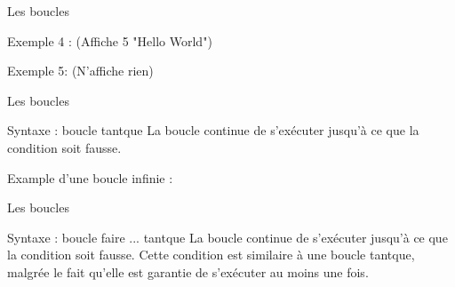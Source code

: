 	\begin{frame}{Les boucles}
		\begin{minipage}[t]{0.8\linewidth}
			Exemple 4 :  (\alert{Affiche 5 "Hello World"})
			\forExmpFour
		\end{minipage}
		\begin{minipage}[t]{0.8\linewidth}
			Exemple 5: (\alert{N'affiche rien})
			\forExmpFive
		\end{minipage}
	\end{frame}



	\begin{frame}{Les boucles}
		\begin{block}{Syntaxe : boucle tantque}
			\WhileSyntax
			La boucle continue de s'exécuter jusqu'à ce que la condition soit \alert{fausse}.
		\end{block}
		\begin{exampleblock}{Example d'une boucle infinie :}
			\WhileInfinite
		\end{exampleblock}
	\end{frame}

	\begin{frame}{Les boucles}
		\begin{block}{Syntaxe : boucle faire ... tantque}
			\doWhileSyntax
			La boucle continue de s'exécuter jusqu'à ce que la condition soit \alert{fausse}. 
			Cette condition est similaire à une boucle tantque, malgrée le fait qu'elle est garantie de s'exécuter au moins une fois.
		\end{block}
	\end{frame}
	

